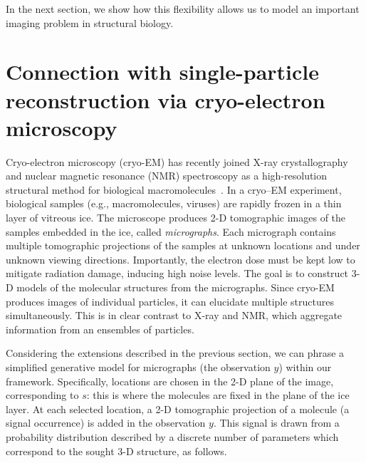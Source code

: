 \documentclass[12pt]{article}
\newcommand{\1}{\mathbf{1}}
\theoremstyle{plain}
\theoremstyle{definition}
\theoremstyle{remark}
\theoremstyle{plain}
\theoremstyle{remark}
\theoremstyle{plain}
\theoremstyle{plain}
\theoremstyle{plain}
\numberwithin{equation}{section}
\begin{document}
In the next section, we show how this flexibility allows us to model an important imaging problem in structural biology.



\section{Connection with single-particle reconstruction via cryo-electron microscopy}

Cryo-electron microscopy (cryo-EM)  has recently joined X-ray crystallography and nuclear magnetic resonance (NMR) spectroscopy as a high-resolution structural method for biological macromolecules~\cite{frank2006three,kuhlbrandt2014resolution,bartesaghi20152}.
In a cryo--EM experiment, biological samples (e.g., macromolecules, viruses) are rapidly frozen in a thin layer of vitreous ice.
The microscope produces 2-D tomographic images of the samples embedded in the ice, called \emph{micrographs}. Each micrograph contains multiple tomographic projections of the samples at unknown locations and under unknown viewing directions. 
Importantly, the electron dose must be kept low to mitigate  radiation damage, inducing high noise levels.
The goal is to construct 3-D models of the molecular structures from the micrographs. 
Since  cryo-EM produces images of individual particles, it can elucidate multiple  structures simultaneously.
This is in clear contrast to  X-ray and NMR, which aggregate information from an ensembles of
particles.

Considering the extensions described in the previous section, we can phrase a simplified generative model for micrographs (the observation $y$) within our framework. Specifically, locations are chosen in the 2-D plane of the image, corresponding to $s$: this is where the molecules are fixed in the plane of the ice layer. At each selected location, a 2-D tomographic projection of a molecule (a signal occurrence) is added in the observation $y$. This signal is drawn from a probability distribution described by a discrete number of parameters which correspond to the sought 3-D structure, as follows.
\end{document}
